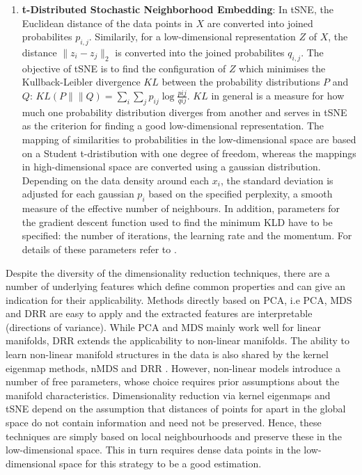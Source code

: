 \begin{enumerate}
\item\textbf{t-Distributed Stochastic Neighborhood Embedding}: In tSNE, the Euclidean distance of the data points in \(X\) are converted into joined probabilites \(p_{i,j}\). Similarily, for  a low-dimensional representation \(Z\) of \(X\), the distance  \(\lVert z_i - z_j\rVert_2 \) is converted into the joined probabilites \(q_{i,j}\). The objective of tSNE is to find the configuration of \(Z\) which minimises the Kullback-Leibler divergence \(KL\) between the probability distributions \(P\) and \(Q\): \(KL(P\lVert \rVert Q) = \sum_i \sum_j p_{ij}\log\frac{pij}{qij}\). \(KL\) in general is a measure for how much one probability distribution diverges from another \citep{} and serves in tSNE as the criterion for finding a good low-dimensional representation. The mapping of similarities to probabilities in the low-dimensional space are based on a Student t-dristibution with one degree of freedom, whereas the mappings in high-dimensional space are converted using a gaussian distribution. Depending on the data density around each \(x_i\), the standard deviation is adjusted for each gaussian \(p_i\) based on the specified perplexity, a smooth measure of the effective number of neighbours. In addition, parameters for the gradient descent function used to find the minimum KLD have to be specified:  the number of iterations, the learning rate and the momentum. For details of these parameters refer to \citep{Maaten2008}.
\end{enumerate}

Despite the diversity of the dimensionality reduction techniques, there are a number of underlying features which define common properties and can give an indication for their applicability. Methods directly based on PCA, i.e PCA, MDS and DRR are easy to apply and the extracted features are interpretable (directions of variance). While PCA and MDS mainly work well for linear manifolds, DRR extends the applicability to non-linear manifolds. The ability to learn non-linear manifold structures in the data is also shared by the kernel eigenmap methods, nMDS and DRR \citep{Coifman2006}. However, non-linear models introduce a number of free parameters, whose choice requires prior assumptions about the manifold characteristics. Dimensionality reduction via kernel eigenmaps and tSNE depend on the assumption that distances of points for apart in the global space do not contain information and need not be preserved. Hence, these techniques are simply based on local neighbourhoods and preserve these in the low-dimensional space. This in turn requires dense data points in the low-dimensional space for this strategy to be a good estimation. 

